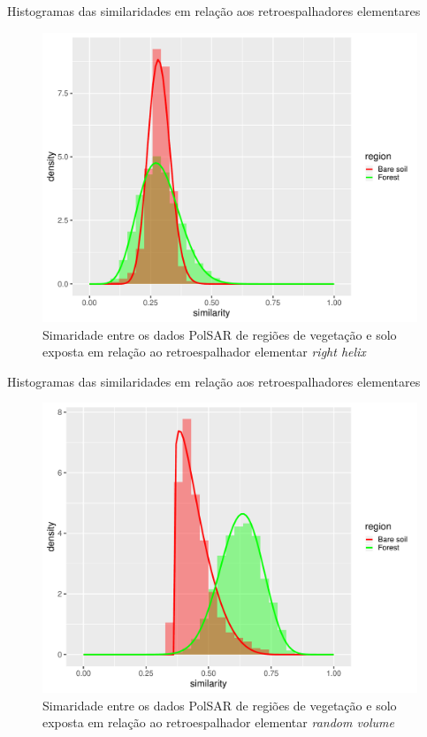 \documentclass{beamer} %
\begin{document}
\begin{frame}{Histogramas das similaridades em relação aos retroespalhadores elementares}

\begin{figure}
    \centering
    \includegraphics[width = .6\linewidth]{rh.pdf}
    \caption{Simaridade entre os dados PolSAR de regiões de vegetação e solo exposta em relação ao retroespalhador elementar \textit{right helix}}
    \label{fig:rh}
\end{figure}
    
\end{frame}

\begin{frame}{Histogramas das similaridades em relação aos retroespalhadores elementares}

\begin{figure}
    \centering
    \includegraphics[width = .6\linewidth]{rv.pdf}
    \caption{Simaridade entre os dados PolSAR de regiões de vegetação e solo exposta em relação ao retroespalhador elementar \textit{random volume}}
    \label{fig:rv}
\end{figure}
    
\end{frame}
\end{document}
